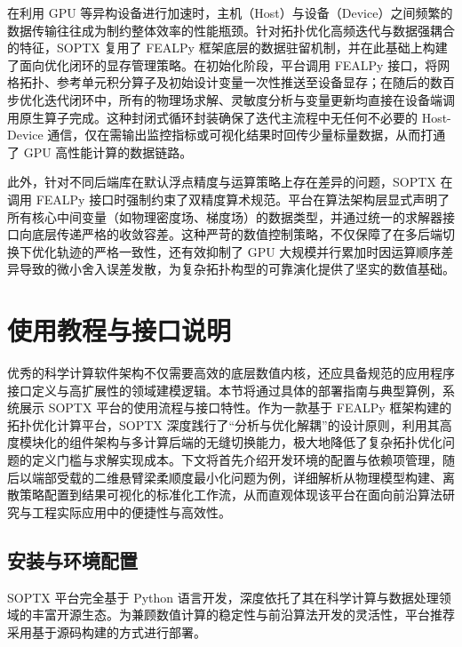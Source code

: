 在利用 GPU 等异构设备进行加速时，主机（Host）与设备（Device）之间频繁的数据传输往往成为制约整体效率的性能瓶颈。针对拓扑优化高频迭代与数据强耦合的特征，SOPTX 复用了 FEALPy 框架底层的数据驻留机制，并在此基础上构建了面向优化闭环的显存管理策略。在初始化阶段，平台调用 FEALPy 接口，将网格拓扑、参考单元积分算子及初始设计变量一次性推送至设备显存；在随后的数百步优化迭代闭环中，所有的物理场求解、灵敏度分析与变量更新均直接在设备端调用原生算子完成。这种封闭式循环封装确保了迭代主流程中无任何不必要的 Host-Device 通信，仅在需输出监控指标或可视化结果时回传少量标量数据，从而打通了 GPU 高性能计算的数据链路。

此外，针对不同后端库在默认浮点精度与运算策略上存在差异的问题，SOPTX 在调用 FEALPy 接口时强制约束了双精度算术规范。平台在算法架构层显式声明了所有核心中间变量（如物理密度场、梯度场）的数据类型，并通过统一的求解器接口向底层传递严格的收敛容差。这种严苛的数值控制策略，不仅保障了在多后端切换下优化轨迹的严格一致性，还有效抑制了 GPU 大规模并行累加时因运算顺序差异导致的微小舍入误差发散，为复杂拓扑构型的可靠演化提供了坚实的数值基础。


\section{使用教程与接口说明}
\label{sec:soptx_usage}

优秀的科学计算软件架构不仅需要高效的底层数值内核，还应具备规范的应用程序接口定义与高扩展性的领域建模逻辑。本节将通过具体的部署指南与典型算例，系统展示 SOPTX 平台的使用流程与接口特性。作为一款基于 FEALPy 框架构建的拓扑优化计算平台，SOPTX 深度践行了“分析与优化解耦”的设计原则，利用其高度模块化的组件架构与多计算后端的无缝切换能力，极大地降低了复杂拓扑优化问题的定义门槛与求解实现成本。下文将首先介绍开发环境的配置与依赖项管理，随后以端部受载的二维悬臂梁柔顺度最小化问题为例，详细解析从物理模型构建、离散策略配置到结果可视化的标准化工作流，从而直观体现该平台在面向前沿算法研究与工程实际应用中的便捷性与高效性。


\subsection{安装与环境配置}
\label{subsec:soptx_installation}

SOPTX 平台完全基于 Python 语言开发，深度依托了其在科学计算与数据处理领域的丰富开源生态。为兼顾数值计算的稳定性与前沿算法开发的灵活性，平台推荐采用基于源码构建的方式进行部署。

